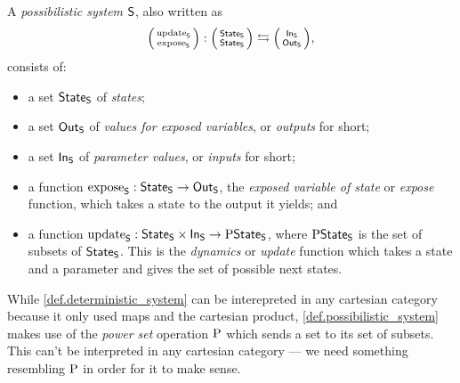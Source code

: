 \documentclass[DynamicalBook]{subfiles}
\begin{document}
\begin{definition}\label{def.possibilistic_system}
  A \emph{possibilistic system} $\mathsf{S}$, also written as 
  $$\lens{\update{S}}{\expose{S}} : \lens{\State{S}}{\State{S}} \leftrightarrows \lens{\In{S}}{\Out{S}},$$ 
  consists of:
  \begin{itemize}
    \item a set $\mathsf{State}_{\mathsf{S}}$ of \emph{states};
    \item a set $\mathsf{Out}_{\mathsf{S}}$ of \emph{values for exposed variables}, or \emph{outputs}
      for short;
    \item a set $\mathsf{In}_{\mathsf{S}}$ of \emph{parameter values}, or \emph{inputs} for short;
    \item a function $\mathrm{expose}_{\mathsf{S}} : \mathsf{State}_{\mathsf{S}} \to \mathsf{Out}_{\mathsf{S}}$, the \emph{exposed variable of state} or
      \emph{expose} function, which takes a state to the output it yields; and
    \item a function $\mathrm{update}_{\mathsf{S}} : \mathsf{State}_{\mathsf{S}} \times \mathsf{In}_{\mathsf{S}} \to
      \mathrm{P}\mathsf{State}_{\mathsf{S}}$, where $\mathrm{P}\mathsf{State}_{\mathsf{S}}$ is the set of subsets of
      $\mathsf{State}_{\mathsf{S}}$. This is the \emph{dynamics} or
      \emph{update} function which takes a state and a parameter and gives the
      set of possible next states.
  \end{itemize}
\end{definition}

\begin{remark}
  While \cref{def.deterministic_system} can be interepreted in any cartesian
  category because it only used maps and the cartesian product,
  \cref{def.possibilistic_system} makes use of the \emph{power set} operation
  $\mathrm{P}$ which sends a set to its set of subsets. This can't be interpreted
  in any cartesian category --- we need something resembling $\mathrm{P}$ in order
  for it to make sense.
\end{remark}
\end{document}

